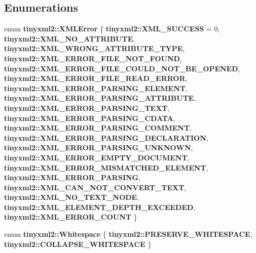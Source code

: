 \subsection*{Enumerations}
\begin{DoxyCompactItemize}
\item 
enum \textbf{ tinyxml2\+::\+X\+M\+L\+Error} \{ \newline
\textbf{ tinyxml2\+::\+X\+M\+L\+\_\+\+S\+U\+C\+C\+E\+SS} = 0, 
\textbf{ tinyxml2\+::\+X\+M\+L\+\_\+\+N\+O\+\_\+\+A\+T\+T\+R\+I\+B\+U\+TE}, 
\textbf{ tinyxml2\+::\+X\+M\+L\+\_\+\+W\+R\+O\+N\+G\+\_\+\+A\+T\+T\+R\+I\+B\+U\+T\+E\+\_\+\+T\+Y\+PE}, 
\textbf{ tinyxml2\+::\+X\+M\+L\+\_\+\+E\+R\+R\+O\+R\+\_\+\+F\+I\+L\+E\+\_\+\+N\+O\+T\+\_\+\+F\+O\+U\+ND}, 
\newline
\textbf{ tinyxml2\+::\+X\+M\+L\+\_\+\+E\+R\+R\+O\+R\+\_\+\+F\+I\+L\+E\+\_\+\+C\+O\+U\+L\+D\+\_\+\+N\+O\+T\+\_\+\+B\+E\+\_\+\+O\+P\+E\+N\+ED}, 
\textbf{ tinyxml2\+::\+X\+M\+L\+\_\+\+E\+R\+R\+O\+R\+\_\+\+F\+I\+L\+E\+\_\+\+R\+E\+A\+D\+\_\+\+E\+R\+R\+OR}, 
\textbf{ tinyxml2\+::\+X\+M\+L\+\_\+\+E\+R\+R\+O\+R\+\_\+\+P\+A\+R\+S\+I\+N\+G\+\_\+\+E\+L\+E\+M\+E\+NT}, 
\textbf{ tinyxml2\+::\+X\+M\+L\+\_\+\+E\+R\+R\+O\+R\+\_\+\+P\+A\+R\+S\+I\+N\+G\+\_\+\+A\+T\+T\+R\+I\+B\+U\+TE}, 
\newline
\textbf{ tinyxml2\+::\+X\+M\+L\+\_\+\+E\+R\+R\+O\+R\+\_\+\+P\+A\+R\+S\+I\+N\+G\+\_\+\+T\+E\+XT}, 
\textbf{ tinyxml2\+::\+X\+M\+L\+\_\+\+E\+R\+R\+O\+R\+\_\+\+P\+A\+R\+S\+I\+N\+G\+\_\+\+C\+D\+A\+TA}, 
\textbf{ tinyxml2\+::\+X\+M\+L\+\_\+\+E\+R\+R\+O\+R\+\_\+\+P\+A\+R\+S\+I\+N\+G\+\_\+\+C\+O\+M\+M\+E\+NT}, 
\textbf{ tinyxml2\+::\+X\+M\+L\+\_\+\+E\+R\+R\+O\+R\+\_\+\+P\+A\+R\+S\+I\+N\+G\+\_\+\+D\+E\+C\+L\+A\+R\+A\+T\+I\+ON}, 
\newline
\textbf{ tinyxml2\+::\+X\+M\+L\+\_\+\+E\+R\+R\+O\+R\+\_\+\+P\+A\+R\+S\+I\+N\+G\+\_\+\+U\+N\+K\+N\+O\+WN}, 
\textbf{ tinyxml2\+::\+X\+M\+L\+\_\+\+E\+R\+R\+O\+R\+\_\+\+E\+M\+P\+T\+Y\+\_\+\+D\+O\+C\+U\+M\+E\+NT}, 
\textbf{ tinyxml2\+::\+X\+M\+L\+\_\+\+E\+R\+R\+O\+R\+\_\+\+M\+I\+S\+M\+A\+T\+C\+H\+E\+D\+\_\+\+E\+L\+E\+M\+E\+NT}, 
\textbf{ tinyxml2\+::\+X\+M\+L\+\_\+\+E\+R\+R\+O\+R\+\_\+\+P\+A\+R\+S\+I\+NG}, 
\newline
\textbf{ tinyxml2\+::\+X\+M\+L\+\_\+\+C\+A\+N\+\_\+\+N\+O\+T\+\_\+\+C\+O\+N\+V\+E\+R\+T\+\_\+\+T\+E\+XT}, 
\textbf{ tinyxml2\+::\+X\+M\+L\+\_\+\+N\+O\+\_\+\+T\+E\+X\+T\+\_\+\+N\+O\+DE}, 
\textbf{ tinyxml2\+::\+X\+M\+L\+\_\+\+E\+L\+E\+M\+E\+N\+T\+\_\+\+D\+E\+P\+T\+H\+\_\+\+E\+X\+C\+E\+E\+D\+ED}, 
\textbf{ tinyxml2\+::\+X\+M\+L\+\_\+\+E\+R\+R\+O\+R\+\_\+\+C\+O\+U\+NT}
 \}
\item 
enum \textbf{ tinyxml2\+::\+Whitespace} \{ \textbf{ tinyxml2\+::\+P\+R\+E\+S\+E\+R\+V\+E\+\_\+\+W\+H\+I\+T\+E\+S\+P\+A\+CE}, 
\textbf{ tinyxml2\+::\+C\+O\+L\+L\+A\+P\+S\+E\+\_\+\+W\+H\+I\+T\+E\+S\+P\+A\+CE}
 \}
\end{DoxyCompactItemize}


